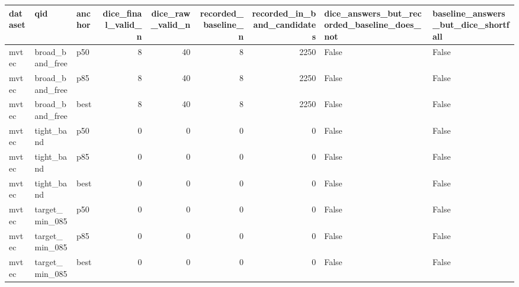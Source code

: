 \begin{tabular}{lllrrrrll}
\toprule
 dataset &                  qid & anchor &  dice\_final\_valid\_n &  dice\_raw\_valid\_n &  recorded\_baseline\_n &  recorded\_in\_band\_candidates &  dice\_answers\_but\_recorded\_baseline\_does\_not &  baseline\_answers\_but\_dice\_shortfall \\
\midrule
   mvtec &      broad\_band\_free &    p50 &                   8 &                40 &                    8 &                         2250 &                                        False &                                False \\
   mvtec &      broad\_band\_free &    p85 &                   8 &                40 &                    8 &                         2250 &                                        False &                                False \\
   mvtec &      broad\_band\_free &   best &                   8 &                40 &                    8 &                         2250 &                                        False &                                False \\
   mvtec &           tight\_band &    p50 &                   0 &                 0 &                    0 &                            0 &                                        False &                                False \\
   mvtec &           tight\_band &    p85 &                   0 &                 0 &                    0 &                            0 &                                        False &                                False \\
   mvtec &           tight\_band &   best &                   0 &                 0 &                    0 &                            0 &                                        False &                                False \\
   mvtec &       target\_min\_085 &    p50 &                   0 &                 0 &                    0 &                            0 &                                        False &                                False \\
   mvtec &       target\_min\_085 &    p85 &                   0 &                 0 &                    0 &                            0 &                                        False &                                False \\
   mvtec &       target\_min\_085 &   best &                   0 &                 0 &                    0 &                            0 &                                        False &                                False \\

\end{tabular}
